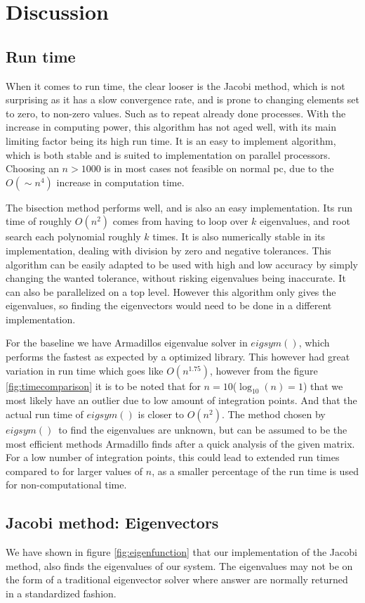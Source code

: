 \documentclass[%
reprint,
nofootinbib,
amsmath,amssymb,
aps,
]{revtex4-1}
\begin{document}
\section{Discussion}%
\subsection{Run time}%
When it comes to run time, the clear looser is the Jacobi method, which is not surprising as it has a slow convergence rate, and is prone to changing elements set to zero, to non-zero values. Such as to repeat already done processes. With the increase in computing power, this algorithm has not aged well, with its main limiting factor being its high run time. It is an easy to implement algorithm, which is both stable and is suited to implementation on parallel processors\cite{mortenJM}. Choosing an $n>1000$ is in most cases not feasible on normal pc, due to the $O(\sim n^4)$ increase in computation time. 

The bisection method performs well, and is also an easy implementation. Its run time of roughly $O(n^2)$ comes from having to loop over $k$ eigenvalues, and root search each polynomial roughly $k$ times. It is also numerically stable in its implementation\cite{barth1967calculation}, dealing with division by zero and negative tolerances. This algorithm can be easily adapted to be used with high and low accuracy by simply changing the wanted tolerance, without risking eigenvalues being inaccurate. It can also be parallelized on a top level. However this algorithm only gives the eigenvalues, so finding the eigenvectors would need to be done in a different implementation. 

For the baseline we have Armadillos eigenvalue solver in $eigsym()$, which performs the fastest as expected by a optimized library. This however had great variation in run time which goes like $O(n^{1.75})$, however from the figure \ref{fig:timecomparison} it is to be noted that for $n=10$($\log_{10}(n) = 1$) that we most likely have an outlier due to low amount of integration points. And that the actual run time of $eigsym()$ is closer to $O(n^2)$. The method chosen by $eigsym()$ to find the eigenvalues are unknown, but can be assumed to be the most efficient methods Armadillo finds after a quick analysis of the given matrix. For a low number of integration points, this could lead to extended run times compared to for larger values of $n$, as a smaller percentage of the run time is used for non-computational time. 
\subsection{Jacobi method: Eigenvectors}%
We have shown in figure \ref{fig:eigenfunction} that our implementation of the Jacobi method, also finds the eigenvalues of our system. The eigenvalues may not be on the form of a traditional eigenvector solver where answer are normally returned in a standardized fashion. 
\end{document}
